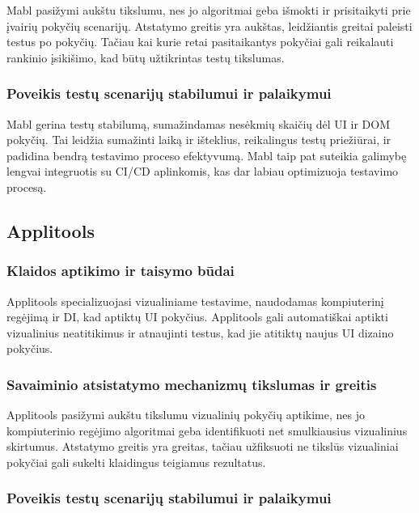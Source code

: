 \documentclass[
]{VUMIFPSkursinis}
\begin{document}
Mabl pasižymi aukštu tikslumu, nes jo algoritmai geba išmokti ir prisitaikyti prie įvairių pokyčių scenarijų. Atstatymo greitis yra aukštas, leidžiantis greitai paleisti testus po pokyčių. Tačiau kai kurie retai pasitaikantys pokyčiai gali reikalauti rankinio įsikišimo, kad būtų užtikrintas testų tikslumas.

\subsubsection{Poveikis testų scenarijų stabilumui ir palaikymui}

Mabl gerina testų stabilumą, sumažindamas nesėkmių skaičių dėl UI ir DOM pokyčių. Tai leidžia sumažinti laiką ir išteklius, reikalingus testų priežiūrai, ir padidina bendrą testavimo proceso efektyvumą. Mabl taip pat suteikia galimybę lengvai integruotis su CI/CD aplinkomis, kas dar labiau optimizuoja testavimo procesą.

\subsection{Applitools}

\subsubsection{Klaidos aptikimo ir taisymo būdai}

Applitools specializuojasi vizualiniame testavime, naudodamas kompiuterinį regėjimą ir DI, kad aptiktų UI pokyčius. Applitools gali automatiškai aptikti vizualinius neatitikimus ir atnaujinti testus, kad jie atitiktų naujus UI dizaino pokyčius.

\subsubsection{Savaiminio atsistatymo mechanizmų tikslumas ir greitis}

Applitools pasižymi aukštu tikslumu vizualinių pokyčių aptikime, nes jo kompiuterinio regėjimo algoritmai geba identifikuoti net smulkiausius vizualinius skirtumus. Atstatymo greitis yra greitas, tačiau užfiksuoti ne tikslūs vizualiniai pokyčiai gali sukelti klaidingus teigiamus rezultatus.

\subsubsection{Poveikis testų scenarijų stabilumui ir palaikymui}
\end{document}
